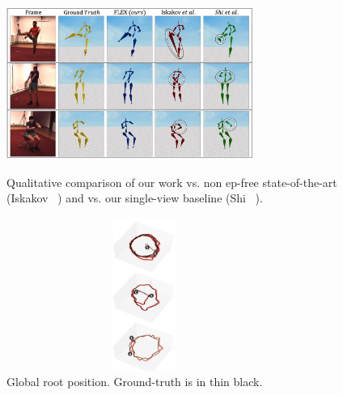 \begin{figure}[t]
\setlength{\abovecaptionskip}{5pt plus 3pt minus 2pt}
\setlength{\belowcaptionskip}{-15pt plus 3pt minus 2pt}
\centering
\begin{minipage}[b]{0.68\linewidth}
    \centering
    \includegraphics[width=\textwidth, height=5.0cm]{./images/competitors_grid.jpg}
    \caption{Qualitative comparison of our work vs. non ep-free state-of-the-art (Iskakov \etal~\cite{iskakov2019learnable}) and vs. our single-view baseline (Shi \etal~\cite{shi2020motionet}).}
    \label{fig:competitors}
\end{minipage}
\hfill
\begin{minipage}[b]{0.27\linewidth}
    \centering
    \includegraphics[width=0.8\textwidth,height=5.0cm]{./images/root_color_vert2.jpg}
    \caption{Global root position. Ground-truth is in thin black.}
    \label{fig:root_pos}
\end{minipage}
\end{figure}

